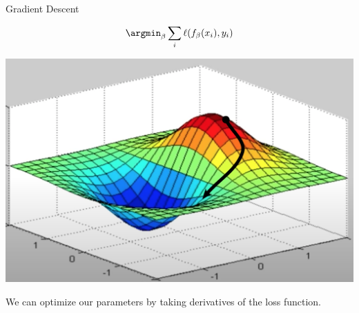 \begin{frame}{Gradient Descent}

	\begin{center}
		\begin{equation*}
			\argmin_\beta \sum_i \ell(f_\beta(x_i), y_i)
		\end{equation*}

		\pause \bigskip

		\includegraphics[width=.4\textwidth]{gradient-descent.png}

		\vspace{.5in} \pause

		We can optimize our parameters by taking derivatives of the loss function.
	\end{center}

\end{frame}

